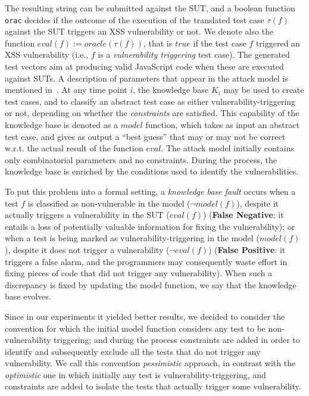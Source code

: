 \begin{tikzborder}{\cite{Gargantini16:validation}}
\begin{tikzborder}{\cite{gargantini_combinatorial_2017}}
\begin{tikzborder}{\cite{gargantini_combinatorial_2017}}
\begin{tikzborder}{\cite{garn2019}}
\bb 
The resulting string can be submitted against the SUT, and a boolean function \texttt{orac} decides if the outcome of the execution of the
translated test case $\tau(f)$ against the SUT triggers an XSS vulnerability or not.
We denote also the function $eval(f):= oracle(\tau(f))$, that is $true$ if the test case $f$ triggered an XSS vulnerability (i.e., $f$ is a \emph{vulnerability triggering} test case).
The generated test vectors aim at producing valid JavaScript code when these are executed against SUTs.
A description of parameters that appear in the attack model is mentioned  in~\cite{bozic2015attack,garn2014applicability,wotawa_combinatorial_2016}. 
At any time point $i$, the knowledge base $K_{i}$ may be used to create test cases, and to classify an abstract test case as either vulnerability-triggering or not, depending on whether the \textit{constraints} are satisfied. %
This capability of the knowledge base is denoted as a $model$ function, which takes as input an abstract test case, and gives as output a ``best guess'' that may or may not be correct w.r.t. the actual result of the function $eval$. 
The attack model initially contains only combinatorial parameters and no constraints. During the process, the knowledge base is enriched by the conditions used to identify the vulnerabilities.

To put this problem into a formal setting, a \textit{knowledge base fault} occurs when a test $f$ is classified as non-vulnerable in the model ($\neg model(f)$), despite it actually triggers a vulnerability in the SUT ($eval(f)$) (\textbf{False Negative}: it entails a loss of potentially valuable information for fixing the vulnerability); or when a test is being marked as vulnerability-triggering in the model ($model(f)$), despite it does not trigger a vulnerability ($\neg eval(f)$) (\textbf{False Positive}: it triggers a false alarm, and the programmers may consequently waste effort in fixing pieces of code that did not trigger any vulnerability). %
When such a discrepancy is fixed by updating the model function, we say that the knowledge base evolves.

Since in our experiments it yielded better results, we decided to consider the convention for which the initial model function considers any test to be non-vulnerability triggering; and during the process constraints are added in order to identify and subsequently exclude all the tests that do not trigger any vulnerability. 
We call this convention \emph{pessimistic} approach, in contrast with the \emph{optimistic} one in which initially any test is vulnerability-triggering, and constraints are added to isolate the tests that actually trigger some vulnerability.


\end{tikzborder}
\end{tikzborder}
\end{tikzborder}
\end{tikzborder}
